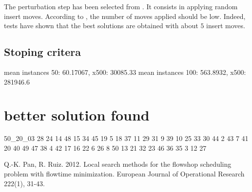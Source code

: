 \documentclass{article}
\begin{document}
The perturbation step has been selected from \cite{ref}.
It consists in applying random insert moves.
According to \cite{ref}, the number of moves applied should be low.
Indeed, tests have shown that the best solutions are obtained with about $5$ insert moves.

\subsection{Stoping critera}

mean instances 50: 60.17067, x500: 30085.33\newline
mean instances 100: 563.8932, x500: 281946.6



\section{better solution found}

50\_20\_03  28 24 14 48 15 34 45 19 5 18 37 11 29 31 9 39 10 25 33 30 44 2 43 7 41 20 40 49 47 38 4 42 17 16 22 6 26 8 50 13 21 32 23 46 36 35 3 12 27 

\begin{thebibliography}{12}

 Q.-K. Pan, R. Ruiz.
2012.
Local search methods for the flowshop scheduling problem with flowtime minimization.
European Journal of Operational Research 222(1), 31-43.

\end{thebibliography}
\end{document}
